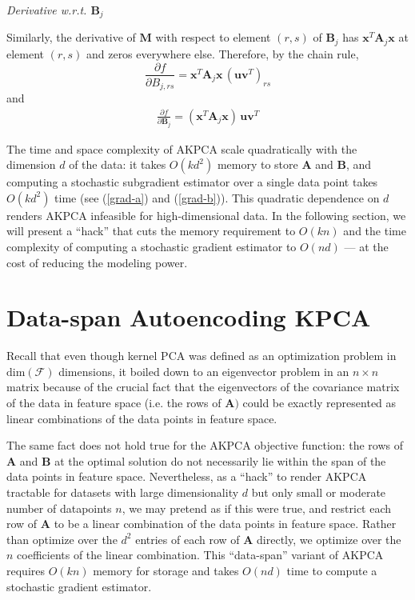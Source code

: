 \documentclass[]{article}
\begin{document}
\textit{Derivative w.r.t. $\mathbf{B}_j$}

Similarly, the derivative of $\mathbf{M}$ with respect to element $(r, s)$ of $\mathbf{B}_j$ has  $\mathbf{x}^T \mathbf{A}_j \mathbf{x}$ at element $(r, s)$ and zeros everywhere else.
Therefore, by the chain rule, 
$$ \frac{\partial f}{\partial B_{j, rs}} = \mathbf{x}^T \mathbf{A}_j \mathbf{x} \, (\mathbf{u} \mathbf{v}^T)_{rs} $$
and
\begin{align}
\label{grad-b}
 \frac{\partial f}{\partial \mathbf{B}_j} = (\mathbf{x}^T \mathbf{A}_j \mathbf{x}) \, \mathbf{u} \mathbf{v}^T
\end{align}

The time and space complexity of AKPCA scale quadratically with the dimension $d$ of the data: it takes $O(k d^2)$ memory to store $\mathbf{A}$ and $\mathbf{B}$, and computing a stochastic subgradient estimator over a single data point takes $O(k d^2)$ time (see (\ref{grad-a}) and (\ref{grad-b})).
This quadratic dependence on $d$ renders AKPCA infeasible for high-dimensional data.
In the following section, we will present a ``hack'' that cuts the memory requirement to $O(kn)$ and the time complexity of computing a stochastic gradient estimator to $O(nd)$ --- at the cost of reducing the modeling power.


\section{Data-span Autoencoding KPCA}

Recall that even though kernel PCA was defined as an optimization problem in $\text{dim}(\mathcal{F})$ dimensions, it boiled down to an eigenvector problem in an $n \times n$ matrix because of the crucial fact that the eigenvectors of the covariance matrix of the data in feature space (i.e. the rows of $\mathbf{A})$ could be exactly represented as linear combinations of the data points in feature space. 

The same fact does not hold true for the AKPCA objective function: the rows of $\mathbf{A}$ and $\mathbf{B}$ at the optimal solution do not necessarily lie within the span of the data points in feature space.
Nevertheless, as a ``hack'' to render AKPCA tractable for datasets with large dimensionality $d$ but only small or moderate number of datapoints $n$, we may pretend as if this were true, and restrict each row of $\mathbf{A}$ to be a linear combination of the data points in feature space.
Rather than optimize over the $d^2$ entries of each row of $\mathbf{A}$ directly, we optimize over the $n$ coefficients of the linear combination.  
This ``data-span'' variant of AKPCA requires $O(kn)$ memory for storage and takes $O(nd)$ time to compute a stochastic gradient estimator.
\end{document}
